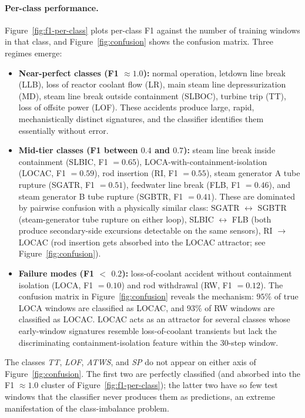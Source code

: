 \paragraph{Per-class performance.}
Figure~\ref{fig:f1-per-class} plots per-class F1 against the number of training windows in that class, and Figure~\ref{fig:confusion} shows the confusion matrix. Three regimes emerge:

\begin{itemize}[leftmargin=*]
    \item \textbf{Near-perfect classes (F1 $\approx 1.0$):} normal operation, letdown line break (LLB), loss of reactor coolant flow (LR), main steam line depressurization (MD), steam line break outside containment (SLBOC), turbine trip (TT), loss of offsite power (LOF). These accidents produce large, rapid, mechanistically distinct signatures, and the classifier identifies them essentially without error.
    \item \textbf{Mid-tier classes (F1 between $0.4$ and $0.7$):} steam line break inside containment (SLBIC, F1 $= 0.65$), LOCA-with-containment-isolation (LOCAC, F1 $= 0.59$), rod insertion (RI, F1 $= 0.55$), steam generator A tube rupture (SGATR, F1 $= 0.51$), feedwater line break (FLB, F1 $= 0.46$), and steam generator B tube rupture (SGBTR, F1 $= 0.41$). These are dominated by pairwise confusion with a physically similar class: SGATR $\leftrightarrow$ SGBTR (steam-generator tube rupture on either loop), SLBIC $\leftrightarrow$ FLB (both produce secondary-side excursions detectable on the same sensors), RI $\rightarrow$ LOCAC (rod insertion gets absorbed into the LOCAC attractor; see Figure~\ref{fig:confusion}).
    \item \textbf{Failure modes (F1 $<$ $0.2$):} loss-of-coolant accident without containment isolation (LOCA, F1 $= 0.10$) and rod withdrawal (RW, F1 $= 0.12$). The confusion matrix in Figure~\ref{fig:confusion} reveals the mechanism: $95\%$ of true LOCA windows are classified as LOCAC, and $93\%$ of RW windows are classified as LOCAC. LOCAC acts as an attractor for several classes whose early-window signatures resemble loss-of-coolant transients but lack the discriminating containment-isolation feature within the 30-step window.
\end{itemize}

The classes \textit{TT}, \textit{LOF}, \textit{ATWS}, and \textit{SP} do not appear on either axis of Figure~\ref{fig:confusion}. The first two are perfectly classified (and absorbed into the F1 $\approx 1.0$ cluster of Figure~\ref{fig:f1-per-class}); the latter two have so few test windows that the classifier never produces them as predictions, an extreme manifestation of the class-imbalance problem.

